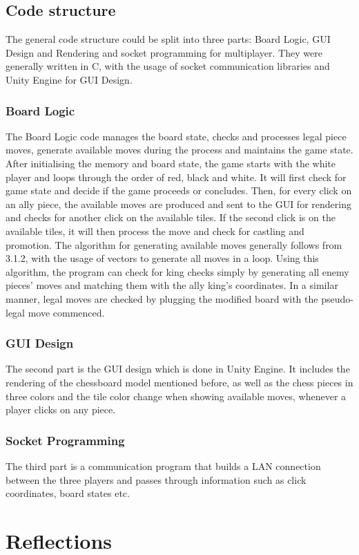 \documentclass[10pt]{article}
\begin{document}
\subsection{Code structure}
The general code structure could be split into three parts: Board Logic, GUI Design and Rendering and socket programming for multiplayer. They were generally written in C, with the usage of socket communication libraries and Unity Engine for GUI Design.
\subsubsection{Board Logic}
The Board Logic code manages the board state, checks and processes legal piece moves, generate available moves during the process and maintains the game state. After initialising the memory and board state, the game starts with the white player and loops through the order of red, black and white. It will first check for game state and decide if the game proceeds or concludes. Then, for every click on an ally piece, the available moves are produced and sent to the GUI for rendering and checks for another click on the available tiles. If the second click is on the available tiles, it will then process the move and check for castling and promotion.\newline
The algorithm for generating available moves generally follows from 3.1.2, with the usage of vectors to generate all moves in a loop. Using this algorithm, the program can check for king checks simply by generating all enemy pieces' moves and matching them with the ally king's coordinates. In a similar manner, legal moves are checked by plugging the modified board with the pseudo-legal move commenced.
\subsubsection{GUI Design}
The second part is the GUI design which is done in Unity Engine. It includes the rendering of the chessboard model mentioned before, as well as the chess pieces in three colors and the tile color change when showing available moves, whenever a player clicks on any piece.
\subsubsection{Socket Programming}
The third part is a communication program that builds a LAN connection between the three players and passes through information such as click coordinates, board states etc.
\section{Reflections}
\end{document}
